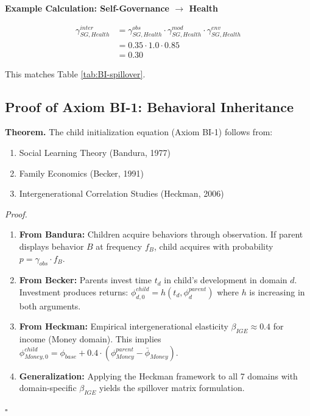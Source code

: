\textbf{Example Calculation: Self-Governance $\rightarrow$ Health}

\begin{align}
\gamma^{inter}_{SG,Health} &= \gamma^{obs}_{SG,Health} \cdot \gamma^{mod}_{SG,Health} \cdot \gamma^{env}_{SG,Health} \\
&= 0.35 \cdot 1.0 \cdot 0.85 \\
&= 0.30
\end{align}

This matches Table \ref{tab:BI-spillover}.

\subsection{Proof of Axiom BI-1: Behavioral Inheritance}

\begin{tcolorbox}[colback=green!5!white, colframe=green!75!black, title=Theorem BI-T1: Behavioral Inheritance Derivation]
\textbf{Theorem.} The child initialization equation (Axiom BI-1) follows from:
\begin{enumerate}[nosep]
\item Social Learning Theory (Bandura, 1977)
\item Family Economics (Becker, 1991)
\item Intergenerational Correlation Studies (Heckman, 2006)
\end{enumerate}

\textit{Proof.}
\begin{enumerate}
\item \textbf{From Bandura:} Children acquire behaviors through observation.
      If parent displays behavior $B$ at frequency $f_B$, child acquires with probability $p = \gamma_{obs} \cdot f_B$.

\item \textbf{From Becker:} Parents invest time $t_d$ in child's development in domain $d$.
      Investment produces returns: $\phi^{child}_{d,0} = h(t_d, \phi^{parent}_d)$ where $h$ is increasing in both arguments.

\item \textbf{From Heckman:} Empirical intergenerational elasticity $\beta_{IGE} \approx 0.4$ for income (Money domain).
      This implies $\phi^{child}_{Money,0} = \phi_{base} + 0.4 \cdot (\phi^{parent}_{Money} - \bar{\phi}_{Money})$.

\item \textbf{Generalization:} Applying the Heckman framework to all 7 domains with domain-specific $\beta_{IGE}$ yields
      the spillover matrix formulation.
\end{enumerate}
\hfill $\square$
\end{tcolorbox}

